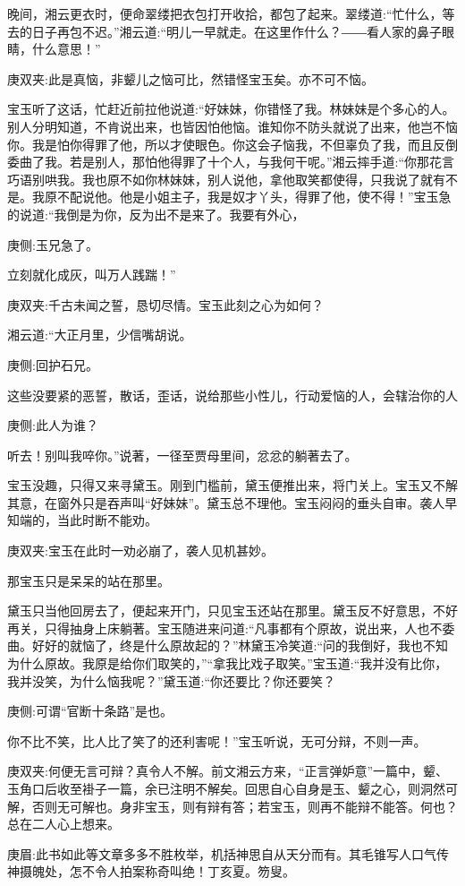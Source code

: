 \begin{parag}
    晚间，湘云更衣时，便命翠缕把衣包打开收拾，都包了起来。翠缕道:“忙什么，等去的日子再包不迟。”湘云道:“明儿一早就走。在这里作什么？――看人家的鼻子眼睛，什么意思！”\begin{note}庚双夹:此是真恼，非颦儿之恼可比，然错怪宝玉矣。亦不可不恼。\end{note}宝玉听了这话，忙赶近前拉他说道:“好妹妹，你错怪了我。林妹妹是个多心的人。别人分明知道，不肯说出来，也皆因怕他恼。谁知你不防头就说了出来，他岂不恼你。我是怕你得罪了他，所以才使眼色。你这会子恼我，不但辜负了我，而且反倒委曲了我。若是别人，那怕他得罪了十个人，与我何干呢。”湘云摔手道:“你那花言巧语别哄我。我也原不如你林妹妹，别人说他，拿他取笑都使得，只我说了就有不是。我原不配说他。他是小姐主子，我是奴才丫头，得罪了他，使不得！”宝玉急的说道:“我倒是为你，反为出不是来了。我要有外心，\begin{note}庚侧:玉兄急了。\end{note}立刻就化成灰，叫万人践踹！”\begin{note}庚双夹:千古未闻之誓，恳切尽情。宝玉此刻之心为如何？\end{note}湘云道:“大正月里，少信嘴胡说。\begin{note}庚侧:回护石兄。\end{note}这些没要紧的恶誓，散话，歪话，说给那些小性儿，行动爱恼的人，会辖治你的人\begin{note}庚侧:此人为谁？\end{note}听去！别叫我啐你。”说著，一径至贾母里间，忿忿的躺著去了。
\end{parag}


\begin{parag}
    宝玉没趣，只得又来寻黛玉。刚到门槛前，黛玉便推出来，将门关上。宝玉又不解其意，在窗外只是吞声叫“好妹妹”。黛玉总不理他。宝玉闷闷的垂头自审。袭人早知端的，当此时断不能劝。\begin{note}庚双夹:宝玉在此时一劝必崩了，袭人见机甚妙。\end{note}那宝玉只是呆呆的站在那里。
\end{parag}


\begin{parag}
    黛玉只当他回房去了，便起来开门，只见宝玉还站在那里。黛玉反不好意思，不好再关，只得抽身上床躺著。宝玉随进来问道:“凡事都有个原故，说出来，人也不委曲。好好的就恼了，终是什么原故起的？”林黛玉冷笑道:“问的我倒好，我也不知为什么原故。我原是给你们取笑的，”“拿我比戏子取笑。”宝玉道:“我并没有比你，我并没笑，为什么恼我呢？”黛玉道:“你还要比？你还要笑？\begin{note}庚侧:可谓“官断十条路”是也。\end{note}你不比不笑，比人比了笑了的还利害呢！”宝玉听说，无可分辩，不则一声。\begin{note}庚双夹:何便无言可辩？真令人不解。前文湘云方来，“正言弹妒意”一篇中，颦、玉角口后收至褂子一篇，余已注明不解矣。回思自心自身是玉、颦之心，则洞然可解，否则无可解也。身非宝玉，则有辩有答；若宝玉，则再不能辩不能答。何也？总在二人心上想来。\end{note}\begin{note}庚眉:此书如此等文章多多不胜枚举，机括神思自从天分而有。其毛锥写人口气传神摄魄处，怎不令人拍案称奇叫绝！丁亥夏。笏叟。\end{note}
\end{parag}


